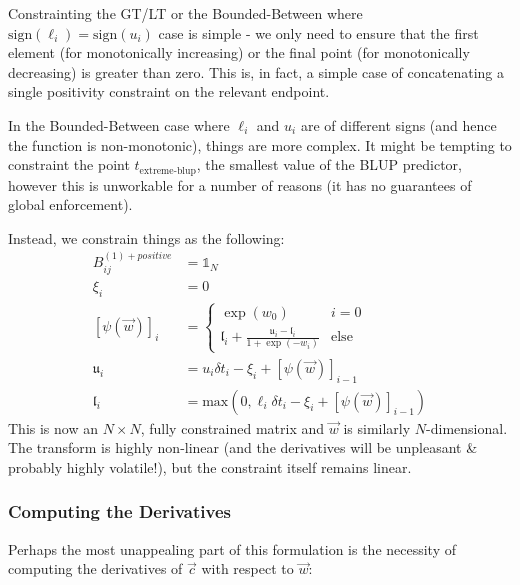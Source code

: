 \documentclass[]{article}
\begin{document}
				Constrainting the GT/LT or the Bounded-Between where $\text{sign}(\ell_i) = \text{sign}(u_i)$ case is simple - we only need to ensure that the first element (for monotonically increasing) or the final point (for monotonically decreasing) is greater than zero. This is, in fact, a simple case of concatenating a single positivity constraint on the relevant endpoint. 

				In the Bounded-Between case where $\ell_i$ and $u_i$ are of different signs (and hence the function is non-monotonic), things are more complex. It might be tempting to constraint the point $t_\text{extreme-blup}$, the smallest value of the BLUP predictor, however this is unworkable for a number of reasons (it has no guarantees of global enforcement).

				Instead, we constrain things as the following:
				\begin{align}
					B^{(1)+positive}_{ij} & = \mathds{1}_{N}
						\\
						\xi_i & = 0
						\\
						[\psi(\vec{w})]_i & = \begin{cases} \exp(w_{0})  & i = 0
							\\
							\mathfrak{l}_i + \frac{\mathfrak{u}_i - \mathfrak{l}_i}{1 + \exp(-w_i)} & \text{else}
							\end{cases}
						\\
						\mathfrak{u}_i & = u_i\delta t_i -\xi_i+ [\psi(\vec{w})]_{i-1}
						\\
						\mathfrak{l}_i & = \text{max}\left(0,{\ell_i \delta t_i} - \xi_i+ [\psi(\vec{w})]_{i-1} \right)
				\end{align}
				This is now an $N\times N$, fully constrained matrix and $\vec{w}$ is similarly $N$-dimensional. The transform is highly non-linear (and the derivatives will be unpleasant \& probably highly volatile!), but the constraint itself remains linear.

		
				\subsubsection{Computing the Derivatives}

					Perhaps the most unappealing part of this formulation is the necessity of computing the derivatives of $\vec{c}$ with respect to $\vec{w}$:
\end{document}
